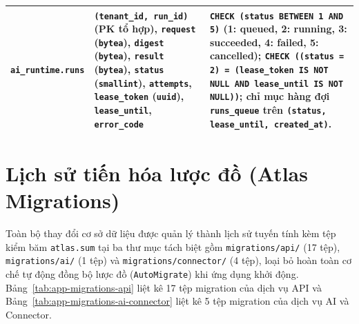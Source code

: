\begin{table}[htbp]
\begin{tabularx}{\linewidth}{@{}
    >{\raggedright\arraybackslash}p{3.4cm}
    >{\raggedright\arraybackslash}p{5.0cm}
    >{\raggedright\arraybackslash}X@{}}
    \texttt{ai\_runtime.\hspace{0pt}runs} &
    \texttt{(tenant\_id, run\_id)} (PK tổ hợp), \texttt{request} (\texttt{bytea}), \texttt{digest} (\texttt{bytea}), \texttt{result} (\texttt{bytea}), \texttt{status} (\texttt{smallint}), \texttt{attempts}, \texttt{lease\_token} (\texttt{uuid}), \texttt{lease\_until}, \texttt{error\_code} &
    \texttt{CHECK (status BETWEEN 1 AND 5)} (1: queued, 2: running, 3: succeeded, 4: failed, 5: cancelled); \texttt{CHECK ((status = 2) = (lease\_token IS NOT NULL AND lease\_until IS NOT NULL))}; chỉ mục hàng đợi \texttt{runs\_queue} trên \texttt{(status, lease\_until, created\_at)}. \\
    \bottomrule
  \end{tabularx}
\end{table}

\section{Lịch sử tiến hóa lược đồ (Atlas Migrations)}
Toàn bộ thay đổi cơ sở dữ liệu được quản lý thành lịch sử tuyến tính kèm tệp kiểm băm \texttt{atlas.\hspace{0pt}sum} tại ba thư mục tách biệt gồm \texttt{migrations/\hspace{0pt}api/} (17 tệp), \texttt{migrations/\hspace{0pt}ai/} (1 tệp) và \texttt{migrations/\hspace{0pt}connector/} (4 tệp), loại bỏ hoàn toàn cơ chế tự động đồng bộ lược đồ (\texttt{Auto\hspace{0pt}Migrate}) khi ứng dụng khởi động. Bảng~\ref{tab:app-migrations-api} liệt kê 17 tệp migration của dịch vụ API và Bảng~\ref{tab:app-migrations-ai-connector} liệt kê 5 tệp migration của dịch vụ AI và Connector.

